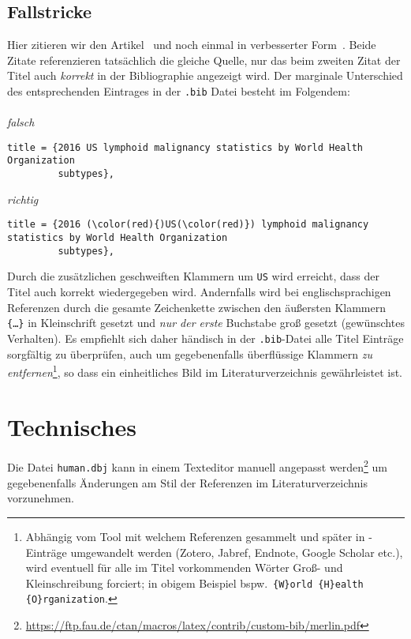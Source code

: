 \documentclass[a4paper,10pt]{scrartcl}
\renewcommand{\cite}{\citep}  %
\begin{document}
\subsection{Fallstricke}
Hier zitieren wir den Artikel~\cite{teras2016_FALSCH} und noch einmal in
verbesserter Form~\cite{teras2016_RICHTIG}. Beide Zitate referenzieren
tats\"achlich die gleiche Quelle, nur das beim zweiten Zitat der
Titel auch \emph{korrekt} in der Bibliographie angezeigt wird. Der
marginale Unterschied des entsprechenden Eintrages
in der \verb|.bib| Datei besteht im Folgendem:\\\\
\emph{falsch}
\begin{Verbatim}
title = {2016 US lymphoid malignancy statistics by World Health Organization
         subtypes},
\end{Verbatim}
\emph{richtig}
\begin{Verbatim}[commandchars=\\\(\)]
title = {2016 (\color(red){)US(\color(red)}) lymphoid malignancy statistics by World Health Organization
         subtypes},
\end{Verbatim}
Durch die zusätzlichen geschweiften Klammern um \texttt{US} wird erreicht, dass der Titel
auch korrekt wiedergegeben wird. Andernfalls wird bei englischsprachigen
Referenzen durch  die gesamte Zeichenkette zwischen den
\"au{\ss}ersten Klammern \texttt{\{\ldots \}} in Kleinschrift gesetzt und
\emph{nur der erste} Buchstabe gro{\ss} gesetzt (gewünschtes Verhalten). Es empfiehlt sich daher händisch in
der
\verb|.bib|-Datei alle Titel Einträge sorgfältig zu überprüfen, auch um
gegebenenfalls überflüssige Klammern \emph{zu entfernen}\footnote{Abhängig vom
Tool mit welchem Referenzen gesammelt und später in -Einträge
umgewandelt werden (Zotero, Jabref, Endnote, Google Scholar etc.), wird
eventuell für alle im Titel vorkommenden Wörter
Gro{\ss}- und Kleinschreibung forciert; in obigem Beispiel bspw.\ \verb|{W}orld {H}ealth {O}rganization|.},
so dass ein einheitliches Bild im Literaturverzeichnis gewährleistet ist.

\section{Technisches}
Die Datei \verb|human.dbj| kann in einem Texteditor manuell angepasst
werden\footnote{%
\url{https://ftp.fau.de/ctan/macros/latex/contrib/custom-bib/merlin.pdf}} um
gegebenenfalls Änderungen am Stil der Referenzen im Literaturverzeichnis
vorzunehmen.
\end{document}
